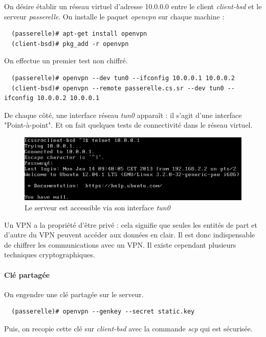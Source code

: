 \documentclass[a4paper]{article}
\begin{document}
On désire établir un réseau virtuel d'adresse 10.0.0.0 entre le client \textit{client-bsd} 
et le serveur \textit{passerelle}. 
On installe le paquet \textit{openvpn} sur chaque machine :
\begin{verbatim}
  (passerelle)# apt-get install openvpn
  (client-bsd)# pkg_add -r openvpn
\end{verbatim}

On effectue un premier test non chiffré.
\begin{verbatim}
  (passerelle)# openvpn --dev tun0 --ifconfig 10.0.0.1 10.0.0.2
  (client-bsd)# openvpn --remote passerelle.cs.sr --dev tun0 --ifconfig 10.0.0.2 10.0.0.1
\end{verbatim}

De chaque côté, une interface réseau \textit{tun0} apparaît : il s'agit
d'une interface "Point-à-point".
Et on fait quelques tests de connectivité dans le réseau virtuel.

\begin{figure}[!ht]
	\centering
	\includegraphics[scale=.6]{Telnet_VPN.PNG}
	\caption{\label{telnet_vpn} Le serveur est accessible via son interface \textit{tun0}}
\end{figure}

Un VPN a la propriété d'être privé : cela signifie que seules les entités de part et
d'autre du VPN peuvent accéder aux données en clair. Il est donc
indispensable de chiffrer les communications avec un VPN. Il existe
cependant plusieurs techniques cryptographiques.

\paragraph{Clé partagée} 

On engendre une clé partagée sur le serveur.
\begin{verbatim}
  (passerelle)# openvpn --genkey --secret static.key
\end{verbatim}

Puis, on recopie cette clé sur \textit{client-bsd} avec la commande \textit{scp}
qui est sécurisée.
\end{document}
